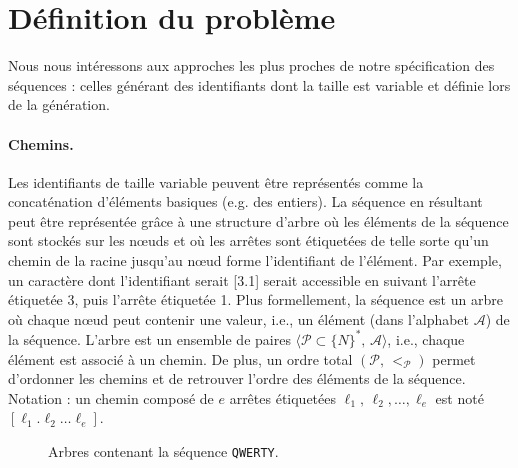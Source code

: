 
\section{Définition du problème}
\label{repl:sec:problem}

Nous nous intéressons aux approches les plus proches de notre spécification des
séquences : celles générant des identifiants dont la taille est variable et
définie lors de la génération.

\paragraph{Chemins.}

Les identifiants de taille variable peuvent être représentés comme la
concaténation d'éléments basiques (e.g. des entiers). La séquence en résultant
peut être représentée grâce à une structure d'arbre où les éléments de la
séquence sont stockés sur les nœuds et où les arrêtes sont étiquetées de telle
sorte qu'un chemin de la racine jusqu'au nœud forme l'identifiant de
l'élément. Par exemple, un caractère dont l'identifiant serait [3.1] serait
accessible en suivant l'arrête étiquetée 3, puis l'arrête étiquetée 1. Plus
formellement, la séquence est un arbre où chaque nœud peut contenir une valeur,
i.e., un élément (dans l'alphabet $\mathcal{A}$) de la séquence. L'arbre est un
ensemble de paires $\langle \mathcal{P}\subset \{N\}^*,\, \mathcal{A} \rangle$,
i.e., chaque élément est associé à un chemin. De plus, un ordre total
$(\mathcal{P},\, <_\mathcal{P})$ permet d'ordonner les chemins et de retrouver
l'ordre des éléments de la séquence. Notation : un chemin composé de $e$ arrêtes
étiquetées $\ell_1,\,\ell_2,\ldots,\ell_e$ est noté
$[\ell_1.\ell_2\ldots\ell_e]$.

\begin{figure}
  \centering
  \hspace{20pt}
  \caption[Arbres contenant une séquence répliquée]
  {Arbres contenant la séquence \texttt{QWERTY}.}
\end{figure}

